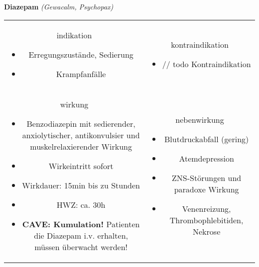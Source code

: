 \begin{frame}{
    \textbf{Diazepam}
    \textit{(Gewacalm, Psychopax)}
}
    \begin{tabular}{c c}
        \begin{beamercolorbox}[wd=\boxwidth\textwidth,ht=\boxheight\textheight,sep=1em]{indikation}
            \begin{itemize}
                \item Erregungszustände, Sedierung
                \item Krampfanfälle
            \end{itemize}
        \end{beamercolorbox} & 
        \begin{beamercolorbox}[wd=\boxwidth\textwidth,ht=\boxheight\textheight,sep=1em]{kontraindikation}
            \begin{itemize}
                \item // todo Kontraindikation 
            \end{itemize}
        \end{beamercolorbox} \\
        \begin{beamercolorbox}[wd=\boxwidth\textwidth,ht=\boxheight\textheight,sep=1em]{wirkung}
            \begin{itemize}
                \item Benzodiazepin mit sedierender, anxiolytischer, antikonvulsier und muskelrelaxierender Wirkung
                \item Wirkeintritt sofort
                \item Wirkdauer: 15min bis zu Stunden
                \item HWZ: ca. 30h
                \item \textbf{CAVE: Kumulation!} Patienten die Diazepam i.v. erhalten, müssen überwacht werden!
            \end{itemize}
        \end{beamercolorbox} & 
        \begin{beamercolorbox}[wd=\boxwidth\textwidth,ht=\boxheight\textheight,sep=1em]{nebenwirkung}
            \begin{itemize}
                \item Blutdruckabfall (gering)
                \item Atemdepression
                \item ZNS-Störungen und paradoxe Wirkung
                \item Venenreizung, Thrombophlebitiden, Nekrose
            \end{itemize}
        \end{beamercolorbox} \\
    \end{tabular}
\end{frame}

